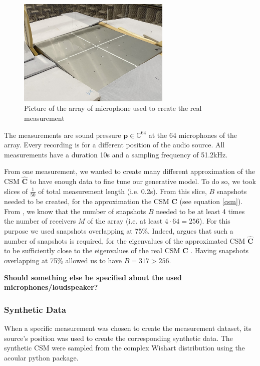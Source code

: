 \documentclass[11pt,a4paper,twoside]{report}
\begin{document}
\begin{figure}
    \centering
    \includegraphics[width=0.65\textwidth]{figs/microphone_array_cropped.jpg}
    \caption{Picture of the array of microphone used to create the real measurement}
    \label{fig:microphone_array}
\end{figure}

The measurements are sound pressure $\mathbf{p} \in \mathbb{C}^{64}$ at the 64 microphones of the array. Every recording is for a different position of the audio source. All measurements have a duration 10s and a sampling frequency of 51.2kHz.

From one measurement, we wanted to create many different approximation of the CSM $\hat{\mathbf{C}}$ to have enough data to fine tune our generative model. To do so, we took slices of $\frac{1}{50}$ of total measurement length (i.e. 0.2s). From this slice, $B$ snapshots needed to be created, for the approximation the CSM $\hat{\mathbf{C}}$ (see equation \ref{csm}). From \cite{gerstoft2012eigenvalues}, we know that the number of snapshots $B$ needed to be at least 4 times the number of receivers $M$ of the array (i.e. at least $4 \cdot 64 = 256$). For this purpose we used snapshots overlapping at 75\%. Indeed, \cite{gerstoft2012eigenvalues} argues that such a number of snapshots is required, for the eigenvalues of the approximated CSM $\hat{\mathbf{C}}$ to be sufficiently close to the eigenvalues of the real CSM $\mathbf{C}$ . Having snapshots overlapping at 75\% allowed us to have $B = 317 >  256$.

\textbf{Should something else be specified about the used microphones/loudspeaker?}

\subsubsection{Synthetic Data}

When a specific measurement was chosen to create the measurement dataset, its source's position was used to create the corresponding synthetic data. The synthetic CSM were sampled from the complex Wishart distribution using the acoular python package.
\end{document}
